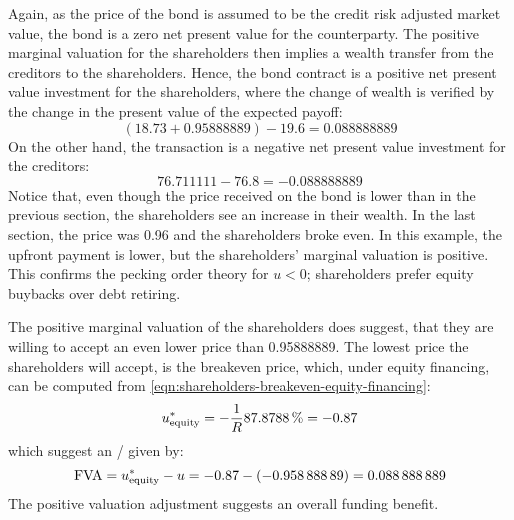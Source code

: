 \documentclass[main.tex]{subfiles}
\begin{document}
            Again, as the price of the bond is assumed to be the credit risk adjusted market value,
            the bond is a zero net present value for the counterparty.
            The positive marginal valuation for the shareholders then implies a wealth transfer from the creditors to the shareholders.
            Hence, the bond contract is a positive net present value investment for the shareholders, 
            where the change of wealth is verified by the change in the present value of the expected payoff:
            \begin{equation*}
                (\num{18.73} + \num{0.95888889}) - \num{19.6} = \num{0.088888889}
            \end{equation*}
            On the other hand, the transaction is a negative net present value investment for the creditors:
            \begin{equation*}
                \num{76.711111} - \num{76.8} = \num{-0.088888889}
            \end{equation*}
            Notice that, even though the price received on the bond is lower than in the previous section,
            the shareholders see an increase in their wealth.
            In the last section, the price was \num{0.96} and the shareholders broke even.
            In this example, the upfront payment is lower, 
            but the shareholders' marginal valuation is positive.
            This confirms the pecking order theory for $u<0$;
            shareholders prefer equity buybacks over debt retiring.

            The positive marginal valuation of the shareholders does suggest,
            that they are willing to accept an even lower price than \num{0.95888889}.
            The lowest price the shareholders will accept, is the breakeven price,
            which, under equity financing, can be computed from 
            \cref{eqn:shareholders-breakeven-equity-financing}:
            \begin{equation*}
                u_{\text{equity}}^{\ast} =
                - \discountfactor
                \pct{0.878788}
                = \num{-0.87}
            \end{equation*}
            which suggest an \FVA/ given by:
            \begin{equation*}
                \FVA/ =
                u_{\text{equity}}^{\ast} - u =
                \num{-0.87} - \left(\num{-0.95888889}\right) =
                \num{0.088888889}
            \end{equation*}
            The positive valuation adjustment suggests an overall funding benefit.
            
\end{document}
